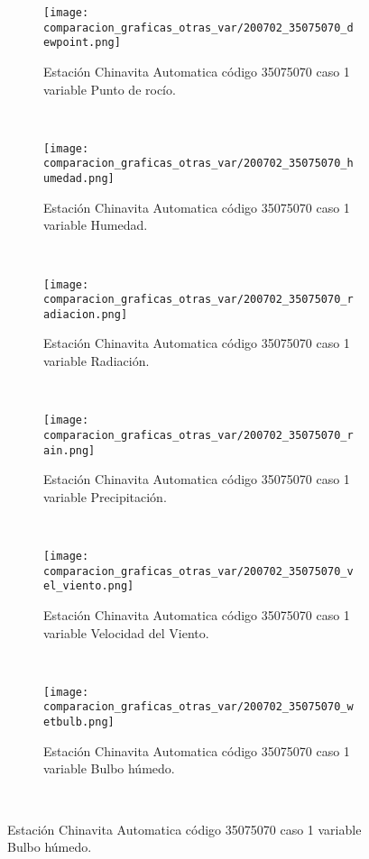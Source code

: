 \begin{figure}[H]
\centering
\begin{subfigure}[normla]{0.4\textwidth}
\caption{Estación Chinavita Automatica código 35075070 caso 1 variable Punto de rocío.}
\texttt{[image: comparacion\_graficas\_otras\_var/200702\_35075070\_dewpoint.png]}
\end{subfigure}
~
\begin{subfigure}[normla]{0.4\textwidth}
\caption{Estación Chinavita Automatica código 35075070 caso 1 variable Humedad.}
\texttt{[image: comparacion\_graficas\_otras\_var/200702\_35075070\_humedad.png]}
\end{subfigure}
~
\begin{subfigure}[normla]{0.4\textwidth}
\caption{Estación Chinavita Automatica código 35075070 caso 1 variable Radiación.}
\texttt{[image: comparacion\_graficas\_otras\_var/200702\_35075070\_radiacion.png]}
\end{subfigure}
~
\begin{subfigure}[normla]{0.4\textwidth}
\caption{Estación Chinavita Automatica código 35075070 caso 1 variable Precipitación.}
\texttt{[image: comparacion\_graficas\_otras\_var/200702\_35075070\_rain.png]}
\end{subfigure}
~
\begin{subfigure}[normla]{0.4\textwidth}
\caption{Estación Chinavita Automatica código 35075070 caso 1 variable Velocidad del Viento.}
\texttt{[image: comparacion\_graficas\_otras\_var/200702\_35075070\_vel\_viento.png]}
\end{subfigure}
~
\begin{subfigure}[normla]{0.4\textwidth}
\caption{Estación Chinavita Automatica código 35075070 caso 1 variable Bulbo húmedo.}
\texttt{[image: comparacion\_graficas\_otras\_var/200702\_35075070\_wetbulb.png]}
\end{subfigure}
~
\end{figure}
           
